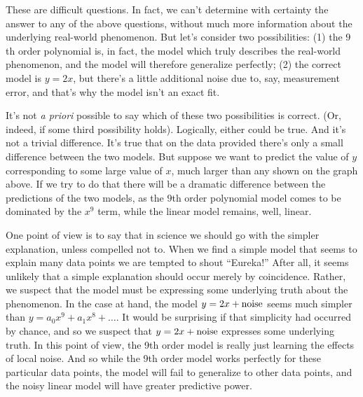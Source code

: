 These are difficult questions. In fact, we can't determine with certainty the answer to any of the above questions, without much more information about the underlying real-world phenomenon. But let's consider two possibilities: (1) the $9$th order polynomial is, in fact, the model which truly describes the real-world phenomenon, and the model will therefore generalize perfectly; (2) the correct model is $y = 2x$, but there's a little additional noise due to, say, measurement error, and that's why the model isn't an exact fit.


It's not \emph{a priori} possible to say which of these two possibilities is correct. (Or, indeed, if some third possibility holds). Logically, either could be true. And it's not a trivial difference. It's true that on the data provided there's only a small difference between the two models. But suppose we want to predict the value of $y$ corresponding to some large value of $x$, much larger than any shown on the graph above. If we try to do that there will be a dramatic difference between the predictions of the two models, as the $9$th order polynomial model comes to be dominated by the $x^9$ term, while the linear model remains, well, linear.


One point of view is to say that in science we should go with the simpler explanation, unless compelled not to. When we find a simple model that seems to explain many data points we are tempted to shout ``Eureka!'' After all, it seems unlikely that a simple explanation should occur merely by coincidence. Rather, we suspect that the model must be expressing some underlying truth about the phenomenon. In the case at hand, the model $y = 2x+{\rm noise}$ seems much simpler than $y = a_0 x^9 + a_1 x^8 + \ldots$. It would be surprising if that simplicity had occurred by chance, and so we suspect that $y = 2x+{\rm noise}$ expresses some underlying truth. In this point of view, the 9th order model is really just learning the effects of local noise. And so while the 9th order model works perfectly for these particular data points, the model will fail to generalize to other data points, and the noisy linear model will have greater predictive power.



